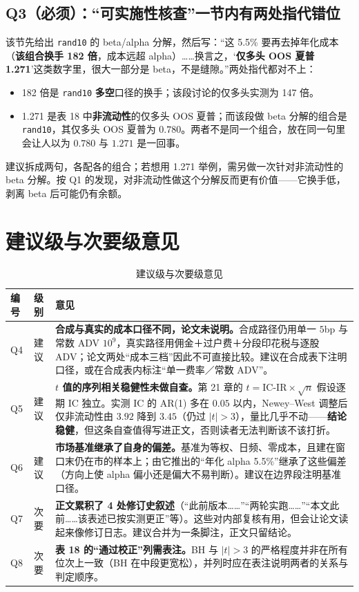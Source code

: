 \documentclass[11pt,a4paper]{ctexart}
\begin{document}
\subsection{Q3（必须）：“可实施性核查”一节内有两处指代错位}

该节先给出 \texttt{rand10} 的 beta/alpha 分解，然后写：“这 5.5\% 要再去掉年化成本（\textbf{该组合换手 182 倍}，成本远超 alpha）……换言之，‘\textbf{仅多头 OOS 夏普 1.271}’这类数字里，很大一部分是 beta，不是缝隙。”两处指代都对不上：

\begin{itemize}
  \item 182 倍是 \texttt{rand10} \textbf{多空}口径的换手；该段讨论的仅多头实测为 147 倍。
  \item 1.271 是表 18 中\textbf{非流动性}的仅多头 OOS 夏普；而该段做 beta 分解的组合是 \texttt{rand10}，其仅多头 OOS 夏普为 $0.780$。两者不是同一个组合，放在同一句里会让人以为 $0.780$ 与 $1.271$ 是一回事。
\end{itemize}

建议拆成两句，各配各的组合；若想用 1.271 举例，需另做一次针对非流动性的 beta 分解。按 Q1 的发现，对非流动性做这个分解反而更有价值——它换手低，剥离 beta 后可能仍有余额。

\section{建议级与次要级意见}

\begin{table}[htbp]
\centering
\caption{建议级与次要级意见}
\label{tab:minor3}
\begin{tabular}{@{}>{\raggedright\arraybackslash}p{0.9cm}>{\raggedright\arraybackslash}p{1.9cm}>{\raggedright\arraybackslash}p{9.8cm}@{}}
\toprule
编号 & 级别 & 意见 \\
\midrule
Q4 & 建议 & \textbf{合成与真实的成本口径不同，论文未说明。}合成路径仍用单一 $5$bp 与常数 ADV $10^9$，真实路径用佣金＋过户费＋分段印花税与逐股 ADV；论文两处“成本三档”因此不可直接比较。建议在合成表下注明口径，或在合成表内标注“单一费率／常数 ADV”。 \\
Q5 & 建议 & \textbf{$t$ 值的序列相关稳健性未做自查。}第 21 章的 $t=\text{IC-IR}\times\sqrt{n}$ 假设逐期 IC 独立。实测 IC 的 AR(1) 多在 $0.05$ 以内，Newey--West 调整后仅非流动性由 $3.92$ 降到 $3.45$（仍过 $|t|>3$），量比几乎不动——\textbf{结论稳健}，但这条自查值得写进正文，否则读者无法判断该不该打折。 \\
Q6 & 建议 & \textbf{市场基准继承了自身的偏差。}基准为等权、日频、零成本，且建在窗口末仍在市的样本上；由它推出的“年化 alpha 5.5\%”继承了这些偏差（方向上使 alpha 偏小还是偏大不易判断）。建议在边界段注明基准口径。 \\
Q7 & 次要 & \textbf{正文累积了 4 处修订史叙述}（“此前版本……”“两轮实跑……”“本文此前……该表述已按实测更正”等）。这些对内部复核有用，但会让论文读起来像修订日志。建议合并为一条脚注，正文只留结论。 \\
Q8 & 次要 & \textbf{表 18 的“通过校正”列需表注。}BH 与 $|t|>3$ 的严格程度并非在所有位次上一致（BH 在中段更宽松），并列时应在表注说明两者的关系与判定顺序。 \\
\bottomrule
\end{tabular}
\end{table}
\end{document}

